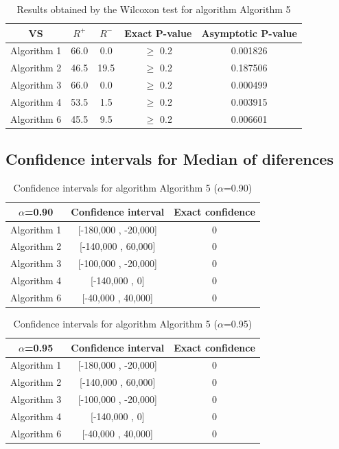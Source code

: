 \documentclass[a4paper,10pt]{article}
\begin{document}
\begin{table}[!htp]
\centering\small
\begin{tabular}{
|c|c|c|c|c|}
\hline
 VS & $R^{+}$ & $R^{-}$ & Exact P-value & Asymptotic P-value \\ \hline 
Algorithm 1 & 66.0 & 0.0 & $\geq$ 0.2 & 0.001826\\ \hline 
Algorithm 2 & 46.5 & 19.5 & $\geq$ 0.2 & 0.187506\\ \hline 
Algorithm 3 & 66.0 & 0.0 & $\geq$ 0.2 & 0.000499\\ \hline 
Algorithm 4 & 53.5 & 1.5 & $\geq$ 0.2 & 0.003915\\ \hline 
Algorithm 6 & 45.5 & 9.5 & $\geq$ 0.2 & 0.006601\\ \hline 

\end{tabular}
\caption{Results obtained by the Wilcoxon test for algorithm Algorithm 5}
\end{table}

\subsection{Confidence intervals for Median of diferences}

\begin{table}[!htp]
\centering\small
\begin{tabular}{
|c|c|c|}
\hline
 $\alpha$=0.90 & Confidence interval & Exact confidence \\ \hline 
Algorithm 1 & [-180,000 , -20,000] & 0\\ \hline 
Algorithm 2 & [-140,000 , 60,000] & 0\\ \hline 
Algorithm 3 & [-100,000 , -20,000] & 0\\ \hline 
Algorithm 4 & [-140,000 , 0] & 0\\ \hline 
Algorithm 6 & [-40,000 , 40,000] & 0\\ \hline 

\end{tabular}
\caption{Confidence intervals for algorithm Algorithm 5 ($\alpha$=0.90)}
\end{table}
\begin{table}[!htp]
\centering\small
\begin{tabular}{
|c|c|c|}
\hline
 $\alpha$=0.95 & Confidence interval & Exact confidence \\ \hline 
Algorithm 1 & [-180,000 , -20,000] & 0\\ \hline 
Algorithm 2 & [-140,000 , 60,000] & 0\\ \hline 
Algorithm 3 & [-100,000 , -20,000] & 0\\ \hline 
Algorithm 4 & [-140,000 , 0] & 0\\ \hline 
Algorithm 6 & [-40,000 , 40,000] & 0\\ \hline 

\end{tabular}
\caption{Confidence intervals for algorithm Algorithm 5 ($\alpha$=0.95)}
\end{table}
\end{document}
